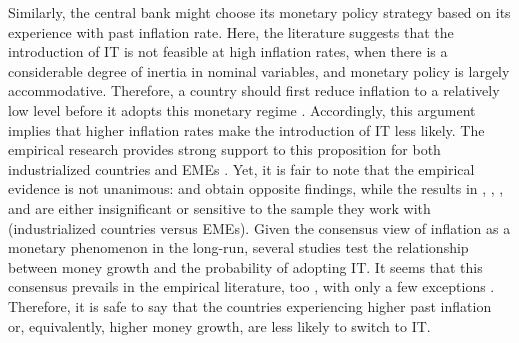 \documentclass{article}
\begin{document}
Similarly, the central bank might choose its monetary policy strategy based on its experience with past inflation rate. Here, the literature suggests that the introduction of IT is not feasible at high inflation rates, when there is a considerable degree of inertia in nominal variables, and monetary policy is largely accommodative. Therefore, a country should first reduce inflation to a relatively low level before it adopts this monetary regime \citep{Carare2002, Masson1997, Mishkin2000}. Accordingly, this argument implies that higher inflation rates make the introduction of IT less likely. The empirical research provides strong support to this proposition for both industrialized countries and EMEs \citep{Ardakani2018, Arsic2022, Hu2006, Lin2010, Lin2007, Lin2009, Minea2014, Minea2021, Pontines2013, Samarina2014, Thornton2017}. Yet, it is fair to note that the empirical evidence is not unanimous: \citet{goncalves2009} and \citet{vega2005} obtain opposite findings, while the results in \citet{fry-mckibbin2014}, \citet{samarina2014}, \citet{samarina2014}, and \citet{wang2016} are either insignificant or sensitive to the sample they work with (industrialized countries versus EMEs). Given the consensus view of inflation as a monetary phenomenon in the long-run, several studies test the relationship between money growth and the probability of adopting IT. It seems that this consensus prevails in the empirical literature, too \citep{Ardakani2018, Arsic2022, Lin2010, Lin2007, Lin2009, Pontines2013, Samarina2014, Yamada2013}, with only a few exceptions \citep{Fry-McKibbin2014, Wang2016}. Therefore, it is safe to say that the countries experiencing higher past inflation or, equivalently, higher money growth, are less likely to switch to IT.
\end{document}

